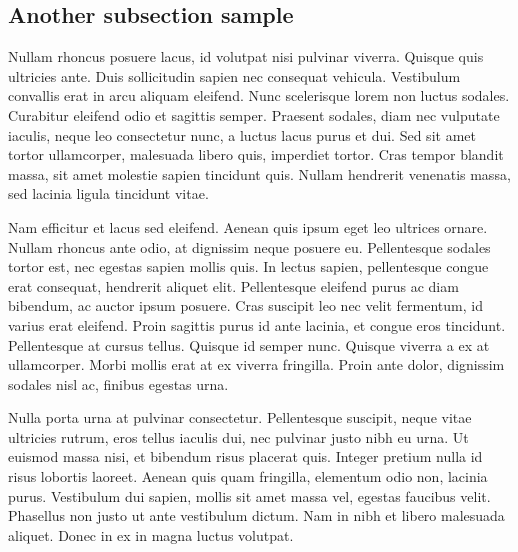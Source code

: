 \subsection{Another subsection sample}

Nullam rhoncus posuere lacus, id volutpat nisi pulvinar viverra. Quisque quis ultricies ante. Duis sollicitudin sapien nec consequat vehicula. Vestibulum convallis erat in arcu aliquam eleifend. Nunc scelerisque lorem non luctus sodales. Curabitur eleifend odio et sagittis semper. Praesent sodales, diam nec vulputate iaculis, neque leo consectetur nunc, a luctus lacus purus et dui. Sed sit amet tortor ullamcorper, malesuada libero quis, imperdiet tortor. Cras tempor blandit massa, sit amet molestie sapien tincidunt quis. Nullam hendrerit venenatis massa, sed lacinia ligula tincidunt vitae.

Nam efficitur et lacus sed eleifend. Aenean quis ipsum eget leo ultrices ornare. Nullam rhoncus ante odio, at dignissim neque posuere eu. Pellentesque sodales tortor est, nec egestas sapien mollis quis. In lectus sapien, pellentesque congue erat consequat, hendrerit aliquet elit. Pellentesque eleifend purus ac diam bibendum, ac auctor ipsum posuere. Cras suscipit leo nec velit fermentum, id varius erat eleifend. Proin sagittis purus id ante lacinia, et congue eros tincidunt. Pellentesque at cursus tellus. Quisque id semper nunc. Quisque viverra a ex at ullamcorper. Morbi mollis erat at ex viverra fringilla. Proin ante dolor, dignissim sodales nisl ac, finibus egestas urna.

Nulla porta urna at pulvinar consectetur. Pellentesque suscipit, neque vitae ultricies rutrum, eros tellus iaculis dui, nec pulvinar justo nibh eu urna. Ut euismod massa nisi, et bibendum risus placerat quis. Integer pretium nulla id risus lobortis laoreet. Aenean quis quam fringilla, elementum odio non, lacinia purus. Vestibulum dui sapien, mollis sit amet massa vel, egestas faucibus velit. Phasellus non justo ut ante vestibulum dictum. Nam in nibh et libero malesuada aliquet. Donec in ex in magna luctus volutpat.

